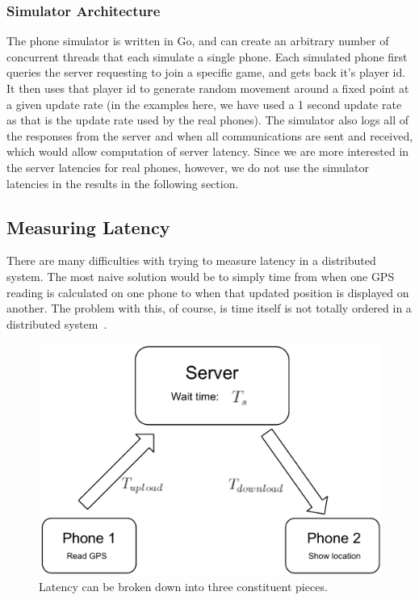 \documentclass{acm_proc_article-sp}
\begin{document}
\subsubsection{Simulator Architecture}
The phone simulator is written in Go, and can create an arbitrary
number of concurrent threads that each simulate a single phone.  Each
simulated phone first queries the server requesting to join a specific
game, and gets back it's player id.  It then uses that player id to
generate random movement around a fixed point at a given update rate
(in the examples here, we have used a 1 second update rate as that is
the update rate used by the real phones). The simulator also logs all
of the responses from the server and when all communications are sent
and received, which would allow computation of server latency.  Since
we are more interested in the server latencies for real phones,
however, we do not use the simulator latencies in the results in the
following section.

\subsection{Measuring Latency}\label{measuring}

There are many difficulties with trying to measure latency in a
distributed system.  The most naive solution would be to simply time
from when one GPS reading is calculated on one phone to when that
updated position is displayed on another. The problem with this, of
course, is time itself is not totally ordered in a distributed
system~\cite{Lamport:1978:TCO}.

\begin{figure}
\centering
\includegraphics[scale=0.4]{figs/LatencyExplanation}
\caption{Latency can be broken down into three constituent pieces.}
\label{fig:LatencyExplanation}
\end{figure}
\end{document}
